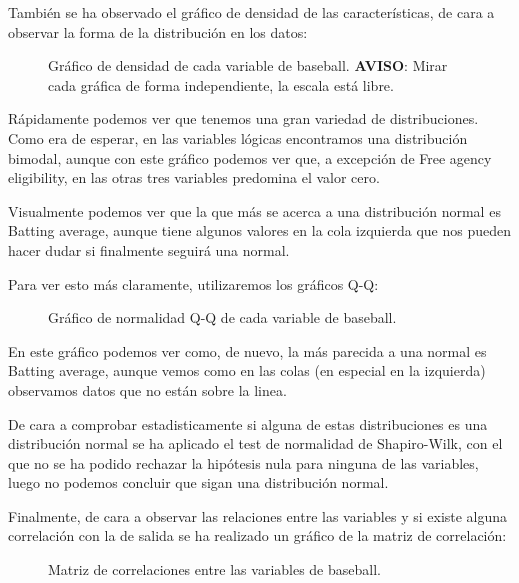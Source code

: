 También se ha observado el gráfico de densidad de las características, de cara a observar la forma de la distribución en los datos:

\begin{figure}[H]
	\centering
	
	\caption{Gráfico de densidad de cada variable de baseball. \textbf{AVISO}: Mirar cada gráfica de forma independiente, la escala está libre.}
	\label{fig:densidad_baseball}
\end{figure}

Rápidamente podemos ver que tenemos una gran variedad de distribuciones. Como era de esperar, en las variables lógicas encontramos una distribución bimodal, aunque con este gráfico podemos ver que, a excepción de Free agency eligibility, en las otras tres variables predomina el valor cero.

Visualmente podemos ver que la que más se acerca a una distribución normal es Batting average, aunque tiene algunos valores en la cola izquierda que nos pueden hacer dudar si finalmente seguirá una normal.

Para ver esto más claramente, utilizaremos los gráficos Q-Q:

\begin{figure}[H]
	\centering
	
	\caption{Gráfico de normalidad Q-Q de cada variable de baseball.}
	\label{fig:qqplot_todos_baseball}
\end{figure}

En este gráfico podemos ver como, de nuevo, la más parecida a una normal es Batting average, aunque vemos como en las colas (en especial en la izquierda) observamos datos que no están sobre la linea.

De cara a comprobar estadisticamente si alguna de estas distribuciones es una distribución normal se ha aplicado el test de normalidad de Shapiro-Wilk, con el que no se ha podido rechazar la hipótesis nula para ninguna de las variables, luego no podemos concluir que sigan una distribución normal.

Finalmente, de cara a observar las relaciones entre las variables y si existe alguna correlación con la de salida se ha realizado un gráfico de la matriz de correlación:

\begin{figure}[H]
	\centering
	
	\caption{Matriz de correlaciones entre las variables de baseball.}
	\label{fig:matriz_correlaciones_baseball}
\end{figure}

